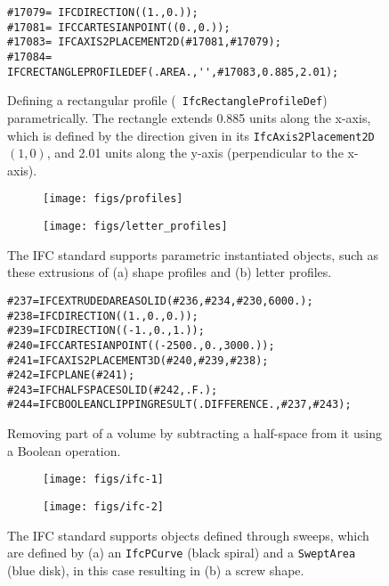 \begin{figure}
\begin{lstlisting}[frame=single]
#17079= IFCDIRECTION((1.,0.));
#17081= IFCCARTESIANPOINT((0.,0.));
#17083= IFCAXIS2PLACEMENT2D(#17081,#17079);
#17084= IFCRECTANGLEPROFILEDEF(.AREA.,'',#17083,0.885,2.01);
\end{lstlisting}
\caption{Defining a rectangular profile (\ie\ \texttt{IfcRectangleProfileDef}) parametrically.
The rectangle extends 0.885 units along the x-axis, which is defined by the direction given in its \texttt{IfcAxis2Placement2D} \((1,0)\), and 2.01 units along the y-axis (perpendicular to the x-axis).}%
\label{fig:parametric}
\end{figure}

\begin{figure}
\centering
\begin{subfigure}[b]{0.45\linewidth}
	\texttt{[image: figs/profiles]}%
	\label{subfig:profiles}
\end{subfigure}
\begin{subfigure}[b]{0.45\linewidth}
	\texttt{[image: figs/letter\_profiles]}%
	\label{subfig:letter-profiles}
\end{subfigure}
\caption{The IFC standard supports parametric instantiated objects, such as these extrusions of (a) shape profiles and (b) letter profiles.}%
\label{fig:profiles}
\end{figure}

\begin{figure}
\begin{lstlisting}[frame=single]
#237=IFCEXTRUDEDAREASOLID(#236,#234,#230,6000.);
#238=IFCDIRECTION((1.,0.,0.));
#239=IFCDIRECTION((-1.,0.,1.));
#240=IFCCARTESIANPOINT((-2500.,0.,3000.));
#241=IFCAXIS2PLACEMENT3D(#240,#239,#238);
#242=IFCPLANE(#241);
#243=IFCHALFSPACESOLID(#242,.F.);
#244=IFCBOOLEANCLIPPINGRESULT(.DIFFERENCE.,#237,#243);
\end{lstlisting}
\caption{Removing part of a volume by subtracting a half-space from it using a Boolean operation.}%
\label{fig:csg}
\end{figure}

\begin{figure}
\centering
\begin{subfigure}[b]{0.45\linewidth}
	\texttt{[image: figs/ifc-1]}%
	\label{subfig:ifc-1}
\end{subfigure}
\begin{subfigure}[b]{0.45\linewidth}
	\texttt{[image: figs/ifc-2]}%
	\label{subfig:ifc-2}
\end{subfigure}
\caption{The IFC standard supports objects defined through sweeps, which are defined by (a) an \texttt{IfcPCurve} (black spiral) and a \texttt{SweptArea} (blue disk), in this case resulting in (b) a screw shape.}%
\label{fig:sweeps}
\end{figure}

